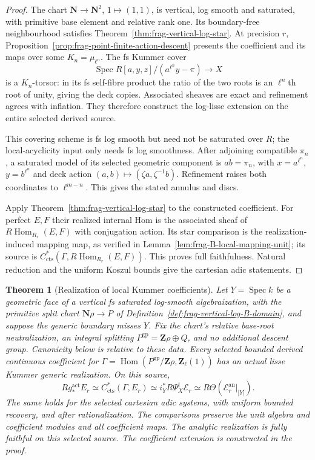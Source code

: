 \documentclass[11pt]{article}
\newtheorem{theorem}{Theorem}[section]
\theoremstyle{definition}
\theoremstyle{remark}
\begin{document}
\begin{proof}
The chart $\mathbf N\to\mathbf N^2$, $1\mapsto(1,1)$, is vertical,
log smooth and saturated, with primitive base element and relative
rank one.  Its boundary-free neighbourhood satisfies
Theorem~\ref{thm:frag-vertical-log-star}.
At precision $r$, Proposition~\ref{prop:frag-point-finite-action-descent}
presents the coefficient and its maps over some $K_n=\mu_{\ell^n}$.
The fs Kummer cover
\[
 \operatorname{Spec}R[a,y,z]/(a^{\ell^n}y-\pi)\longrightarrow X
\]
is a $K_n$-torsor: in its fs self-fibre product the ratio of the
two roots is an $\ell^n$th root of unity, giving the deck copies.
Associated sheaves are exact and refinement agrees with inflation.
They therefore construct the log-lisse extension on the entire
selected derived source.

This covering scheme is fs log smooth but need not be saturated
over $R$; the local-acyclicity input only needs fs log smoothness.
After adjoining compatible $\pi_n$, a saturated model of its selected
geometric component is $ab=\pi_n$, with
$x=a^{\ell^n}$, $y=b^{\ell^n}$ and deck action
$(a,b)\mapsto(\zeta a,\zeta^{-1}b)$.  Refinement raises both
coordinates to $\ell^{m-n}$.  This gives the stated annulus and discs.

Apply Theorem~\ref{thm:frag-vertical-log-star} to the constructed
coefficient.  For perfect $E,F$ their realized internal Hom is the
associated sheaf of $R\operatorname{Hom}_{R_r}(E,F)$ with conjugation
action.  Its star comparison is the realization-induced mapping map,
as verified in Lemma~\ref{lem:frag-B-local-mapping-unit}; its source is
$C^*_{\mathrm{cts}}(\Gamma,R\operatorname{Hom}_{R_r}(E,F))$.
This proves full faithfulness.  Natural reduction and the uniform
Koszul bounds give the cartesian adic statements.
\end{proof}

\begin{theorem}[Realization of local Kummer coefficients]
\label{thm:frag-theorem-B-local-closed}
Let $Y=\operatorname{Spec}k$ be a geometric face of a vertical fs saturated
log-smooth algebraization, with the primitive split chart
$\mathbf N\rho\to P$ of Definition~\ref{def:frag-vertical-log-B-domain},
and suppose the generic boundary misses $Y$.  Fix the chart's relative
base-root neutralization, an integral splitting
$P^{\mathrm{gp}}=\mathbf Z\rho\oplus Q$, and no additional descent
group.  Canonicity below is relative to these data.  Every selected
bounded derived continuous coefficient for
$\Gamma=\operatorname{Hom}(P^{\mathrm{gp}}/\mathbf Z\rho,\mathbf Z_\ell(1))$
has an actual lisse Kummer generic realization.  On this source,
\[
 Rg_*^{\mathrm{act}}E_r\simeq C^*_{\mathrm{cts}}(\Gamma,E_r)
 \simeq i_Y^*R\Psi^t_X\mathcal E_r
 \simeq R\Theta(\mathcal E_r^{\mathrm{an}}|_{]Y[}).
\]
The same holds for the selected cartesian adic systems, with uniform
bounded recovery, and after rationalization.  The comparisons preserve
the unit algebra and coefficient modules and all coefficient maps.
The analytic realization is fully faithful on this selected source.
The coefficient extension is constructed in the proof.
\end{theorem}
\end{document}
